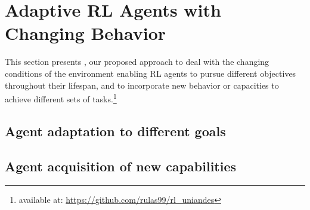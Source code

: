 
\section{Adaptive \ac{RL} Agents with Changing Behavior}
\label{sec:implementation}

This section presents \adaptiverl, our proposed approach to deal with the changing conditions of the 
environment enabling \ac{RL} agents to pursue different objectives throughout their lifespan, and to 
incorporate new behavior or capacities to achieve different sets of tasks.\footnote{available at: \url{https://github.com/rulas99/rl_uniandes}}

\subsection{Agent adaptation to different goals}


\subsection{Agent acquisition of new capabilities}


\endinput

